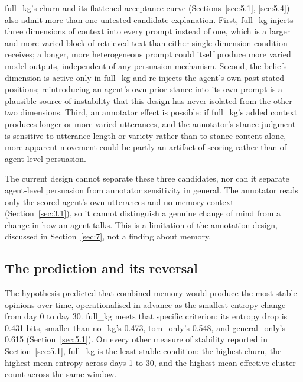 \documentclass[11pt,a4paper]{article}
\newcommand{\src}[1]{\unskip\marginpar{\raggedright\tiny\textcolor{gray}{#1}}}
\newcommand{\src}[1]{\unskip}
\newcommand{\cond}[1]{\textsf{#1}}
\begin{document}
\cond{full\_kg}'s churn and its flattened acceptance curve (Sections~\ref{sec:5.1}, \ref{sec:5.4}) also admit more than one untested candidate explanation. First, \cond{full\_kg} injects three dimensions of context into every prompt instead of one, which is a larger and more varied block of retrieved text than either single-dimension condition receives; a longer, more heterogeneous prompt could itself produce more varied model outputs, independent of any persuasion mechanism. Second, the beliefs dimension is active only in \cond{full\_kg} and re-injects the agent's own past stated positions\src{methodology\_facts.md, "Memory conditions"}; reintroducing an agent's own prior stance into its own prompt is a plausible source of instability that this design has never isolated from the other two dimensions. Third, an annotator effect is possible: if \cond{full\_kg}'s added context produces longer or more varied utterances, and the annotator's stance judgment is sensitive to utterance length or variety rather than to stance content alone, more apparent movement could be partly an artifact of scoring rather than of agent-level persuasion.

The current design cannot separate these three candidates, nor can it separate agent-level persuasion from annotator sensitivity in general. The annotator reads only the scored agent's own utterances and no memory context (Section~\ref{sec:3.1}), so it cannot distinguish a genuine change of mind from a change in how an agent talks. This is a limitation of the annotation design, discussed in Section~\ref{sec:7}, not a finding about memory.

\subsection{The prediction and its reversal}\label{sec:6.4}

The hypothesis predicted that combined memory would produce the most stable opinions over time, operationalised in advance as the smallest entropy change from day 0 to day 30\src{hypothesis\_and\_scope.md, "What would count as support"}. \cond{full\_kg} meets that specific criterion: its entropy drop is 0.431 bits, smaller than \cond{no\_kg}'s 0.473, \cond{tom\_only}'s 0.548, and \cond{general\_only}'s 0.615 (Section~\ref{sec:5.1}). On every other measure of stability reported in Section~\ref{sec:5.1}, \cond{full\_kg} is the least stable condition: the highest churn, the highest mean entropy across days 1 to 30, and the highest mean effective cluster count across the same window.
\end{document}

